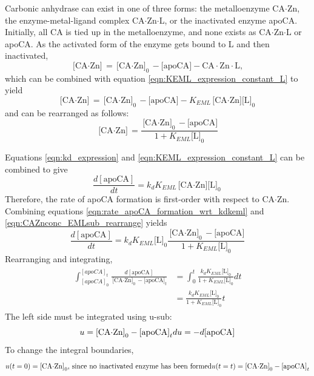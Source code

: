 Carbonic anhydrase can exist in one of three forms: the metalloenzyme CA$\cdot$Zn, the enzyme-metal-ligand complex CA$\cdot$Zn$\cdot$L, or the inactivated enzyme apoCA. Initially, all CA is tied up in the metalloenzyme, and none exists as CA$\cdot$Zn$\cdot$L or apoCA. As the activated form of the enzyme gets bound to L and then inactivated,
\begin{equation}\label{eqn:CAZnconc}
\text{[CA$\cdot$Zn]}=\text{[CA$\cdot$Zn]}_0 - \text{[apoCA]} - \text{CA$\cdot$Zn$\cdot$L},
\end{equation}
which can be combined with equation \eqref{eqn:KEML_expression_constant_L} to yield
\begin{equation}\label{eqn:CAZnconc_EMLsub}
\text{[CA$\cdot$Zn]}=\text{[CA$\cdot$Zn]}_0 - \text{[apoCA]} - K_{EML}\text{[CA$\cdot$Zn][L]}_0
\end{equation}
and can be rearranged as follows:
\begin{equation}\label{eqn:CAZnconc_EMLsub_rearrange}
\text{[CA$\cdot$Zn]}=\frac{\text{[CA$\cdot$Zn]}_0 - \text{[apoCA]}}{1+K_{EML}\text{[L]}_0}
\end{equation}

Equations \eqref{eqn:kd_expression} and \eqref{eqn:KEML_expression_constant_L} can be combined to give
\begin{equation}\label{eqn:rate_apoCA_formation_wrt_kdkeml}
\frac{d[\text{apoCA}]}{dt}=k_{d}K_{EML}\text{[CA$\cdot$Zn][L]}_0
\end{equation}
Therefore, the rate of apoCA formation is first-order with respect to CA$\cdot$Zn. Combining equations \eqref{eqn:rate_apoCA_formation_wrt_kdkeml} and \eqref{eqn:CAZnconc_EMLsub_rearrange} yields
\begin{equation}\label{eqn:preintegration}
\frac{d[\text{apoCA}]}{dt}=k_{d}K_{EML}\text{[L]}_0\frac{\text{[CA$\cdot$Zn]}_0 - \text{[apoCA]}}{1+K_{EML}\text{[L]}_0}
\end{equation}
Rearranging and integrating,
\begin{align}
\begin{split}
\int_{[apoCA]_0}^{[apoCA]_t} \frac{d[\text{apoCA}]}{\text{[CA$\cdot$Zn]}_0 - \text{[apoCA]}_t} &= \int_0^t \frac{k_{d}K_{EML}\text{[L]}_0}{1+K_{EML}\text{[L]}_0}dt \\
&= \frac{k_{d}K_{EML}\text{[L]}_0}{1+K_{EML}\text{[L]}_0}t
\end{split}
\end{align}
The left side must be integrated using u-sub:
\begin{equation*}
u=\text{[CA$\cdot$Zn]}_0 - \text{[apoCA]}_t \\
du=-d[\text{apoCA}]
\end{equation*}
To change the integral boundaries,
\begin{equation*}
u(t=0)=\text{[CA$\cdot$Zn]}_0\text{, since no inactivated enzyme has been formed} \\
u(t=t)=\text{[CA$\cdot$Zn]}_0 - \text{[apoCA]}_t
\end{equation*}
